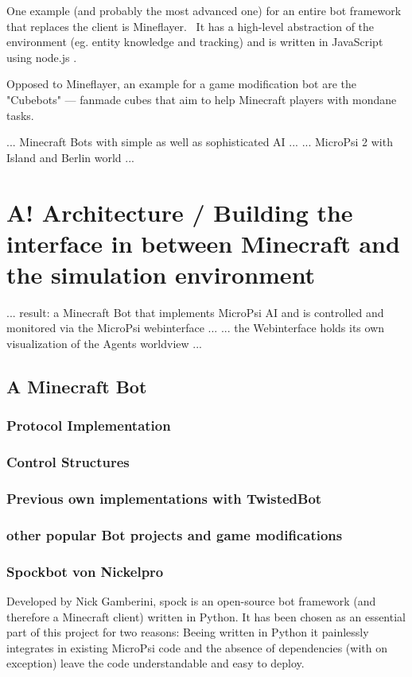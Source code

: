 One example (and probably the most advanced one) for an entire bot framework that replaces the client is Mineflayer.~\cite{github_mineflayer} It has a high-level abstraction of the environment (eg. entity knowledge and tracking) and is written in JavaScript using node.js .

Opposed to Mineflayer, an example for a game modification bot are the "Cubebots" --- fanmade cubes that aim to help Minecraft players with mondane tasks.\cite{mcforums_cubebots}


... Minecraft Bots with simple as well as sophisticated AI ...
... MicroPsi 2 with Island and Berlin world ...

\section{A! Architecture / Building the interface in between Minecraft and the simulation environment}
... result: a Minecraft Bot that implements MicroPsi AI and is controlled and monitored via the MicroPsi webinterface ...
... the Webinterface holds its own visualization of the Agents worldview ...

\subsection{A Minecraft Bot}

\subsubsection{Protocol Implementation}

\subsubsection{Control Structures}

\subsubsection{Previous own implementations with TwistedBot}

\subsubsection{other popular Bot projects and game modifications}

\subsubsection{Spockbot von Nickelpro}
Developed by Nick Gamberini, spock is an open-source bot framework (and therefore a Minecraft client) written in Python. It has been chosen as an essential part of this project for two reasons: Beeing written in Python it painlessly integrates in existing MicroPsi code and the absence of dependencies (with on exception) leave the code understandable and easy to deploy.


